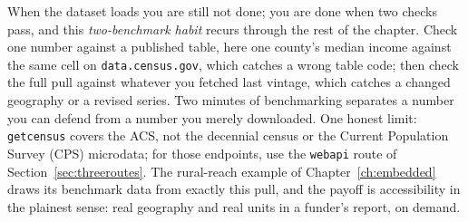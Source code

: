 \documentclass[
    a4paper,
    fontsize=10pt,
    twoside=true,
    numbers=noenddot,
]{kaobook}
\begin{document}
When the dataset loads you are still not done; you are done when two checks pass, and this \emph{two-benchmark habit} recurs through the rest of the chapter. Check one number against a published table, here one county's median income against the same cell on \texttt{data.census.gov}, which catches a wrong table code; then check the full pull against whatever you fetched last vintage, which catches a changed geography or a revised series. Two minutes of benchmarking separates a number you can defend from a number you merely downloaded. One honest limit: \texttt{getcensus} covers the ACS, not the decennial census or the Current Population Survey (CPS) microdata; for those endpoints, use the \texttt{webapi} route of Section~\ref{sec:threeroutes}. The rural-reach example of Chapter~\ref{ch:embedded} draws its benchmark data from exactly this pull, and the payoff is accessibility in the plainest sense: real geography and real units in a funder's report, on demand.
\end{document}
